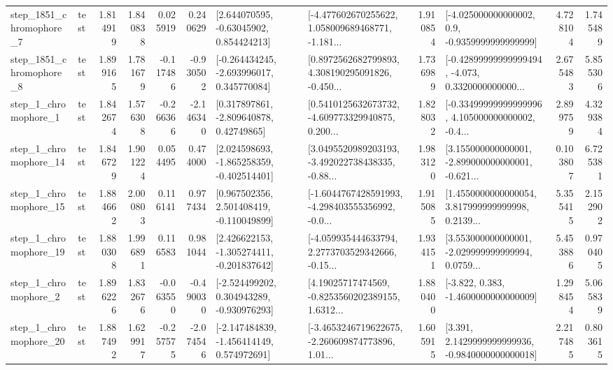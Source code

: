 \begin{tabular}{llrrrrllrlrr}
  step\_1851\_chromophore\_7 &      test &      1.814919 &    1.840838 &      0.025919 &  0.240629 &     [2.644070595, -0.63045902, 0.854424213] &  [-4.477602670255622, 1.058009689468771, -1.181... &       1.910854 &     [-4.025000000000002, 0.9, -0.9359999999999999] &            4.728104 &          1.745489 \\
  step\_1851\_chromophore\_8 &      test &      1.899165 &    1.781679 &     -0.117486 & -0.930502 &   [-0.264434245, -2.693996017, 0.345770084] &  [0.8972562682799893, 4.308190295091826, -0.450... &       1.736989 &  [-0.42899999999999494, -4.073, 0.3320000000000... &            2.675483 &          5.855306 \\
     step\_1\_chromophore\_1 &      test &      1.842674 &    1.576308 &     -0.266366 & -2.146340 &     [0.317897861, -2.809640878, 0.42749865] &  [0.5410125632673732, -4.609773329940875, 0.200... &       1.828032 &  [-0.33499999999999996, 4.105000000000002, -0.4... &            2.899759 &          4.329384 \\
    step\_1\_chromophore\_14 &      test &      1.846729 &    1.901224 &      0.054495 &  0.474000 &   [2.024598693, -1.865258359, -0.402514401] &  [3.0495520989203193, -3.492022738438335, -0.88... &       1.983120 &  [3.155000000000001, -2.899000000000001, -0.621... &            0.103807 &          6.725381 \\
    step\_1\_chromophore\_15 &      test &      1.884662 &    2.000803 &      0.116141 &  0.977434 &    [0.967502356, 2.501408419, -0.110049899] &  [-1.6044767428591993, -4.298403555356992, -0.0... &       1.915085 &  [1.4550000000000054, 3.817999999999998, 0.2139... &            5.355415 &          2.152902 \\
    step\_1\_chromophore\_19 &      test &      1.880308 &    1.996891 &      0.116583 &  0.981044 &   [2.426622153, -1.305274411, -0.201837642] &  [-4.059935444633794, 2.2773703529342666, -0.15... &       1.934151 &  [3.553000000000001, -2.029999999999994, 0.0759... &            5.453886 &          0.970405 \\
     step\_1\_chromophore\_2 &      test &      1.896226 &    1.832676 &     -0.063550 & -0.490030 &   [-2.524499202, 0.304943289, -0.930976293] &  [4.19025717474569, -0.8253560202389155, 1.6312... &       1.880400 &               [-3.822, 0.383, -1.4600000000000009] &            1.298454 &          5.065839 \\
    step\_1\_chromophore\_20 &      test &      1.887492 &    1.629917 &     -0.257575 & -2.074546 &   [-2.147484839, -1.456414149, 0.574972691] &  [-3.4653246719622675, -2.260609874773896, 1.01... &       1.605915 &   [3.391, 2.1429999999999936, -0.9840000000000018] &            2.217485 &          0.803615 \\

\end{tabular}
